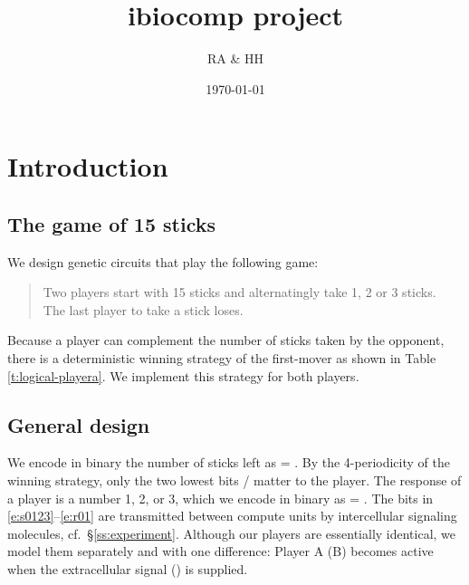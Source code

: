 \documentclass[12pt,notitlepage]{article}
\title{ibiocomp project}
\author{RA \& HH}
\date{\today}
\def\[#1\]{\begin{align}#1\end{align}}
\newcommand{\ra}[1]{{\color{Blue}#1}}
\begin{document}
\maketitle



\section{Introduction}

\subsection{The game of 15 sticks}

We design genetic circuits
that play the following game:
%
\begin{quote}
	Two players start with 15 sticks
	and alternatingly 
	take 1, 2 or 3 sticks.
	\\
	The last player to take a stick loses.
\end{quote}

Because a player can complement
the number of sticks taken by the opponent,
there is a deterministic winning strategy
of the first-mover
as shown in Table \ref{t:logical-playera}.
%
%
We implement this strategy for both players.


\subsection{General design} \label{s:general}

We encode in binary 
the number of sticks left as
\[
    \label{e:s0123}
     = 
    .
\]
%
%
By the 4-periodicity of the winning strategy,
only the two lowest bits /
matter to the player.
%
%
The response of a player is a number 1, 2, or 3,
which we encode in binary as
\[
    \label{e:r01}
     = 
    .
\]
%
The bits in \eqref{e:s0123}--\eqref{e:r01}
are transmitted 
between compute units
by 
intercellular signaling molecules,
cf.~\S\ref{ss:experiment}.
%
Although our players are essentially identical,
we model them separately and with one difference:
Player A (B) becomes active when 
the extracellular signal  () is supplied.

%
\end{document}
